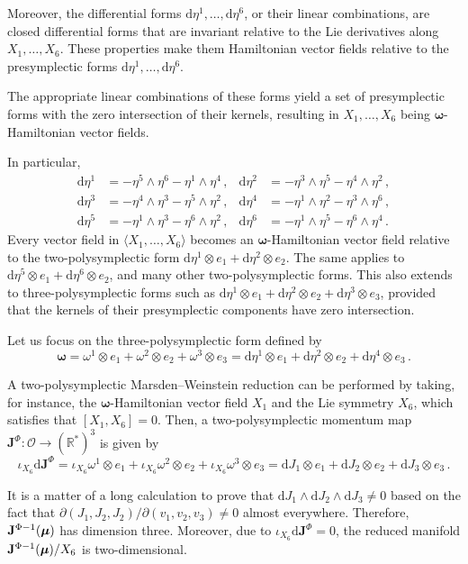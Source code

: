 \documentclass[11pt]{article}
\theoremstyle{plain}
\theoremstyle{definition}
\newcommand{\R}{\mathbb{R}}
\newcommand{\bomega}{{\boldsymbol{\omega}}}
\renewcommand{\d}{\mathrm{d}}
\def\d{\mathrm{d}}
\numberwithin{equation}{section}
\begin{document}
Moreover, the differential forms $\d\eta^1,\ldots, \d\eta^6$, or their linear combinations, are closed differential forms that are invariant relative to the Lie derivatives along $X_1,\ldots, X_6$. These properties make them Hamiltonian vector fields relative to the presymplectic forms $\d\eta^1,\ldots, \d\eta^6$.

The appropriate linear combinations of these forms yield a set of presymplectic forms with the zero intersection of their kernels,  resulting in $X_1,\ldots, X_6$ being $\bomega$-Hamiltonian vector fields.

In particular, 
\begin{align}
    \d\eta^1 &= -\eta^5\wedge\eta^6 - \eta^1\wedge \eta^4\,, & \d\eta^2 &= -\eta^3\wedge \eta^5 - \eta^4\wedge\eta^2\,,\\
    \d\eta^3 &= -\eta^4\wedge\eta^3-\eta^5\wedge\eta^2\,, & \d\eta^4 &= -\eta^1\wedge\eta^2-\eta^3\wedge\eta^6\,,\\
    \d\eta^5 &= -\eta^1\wedge\eta^3-\eta^6\wedge\eta^2\,, & \d\eta^6 &= -\eta^1\wedge\eta^5-\eta^6\wedge\eta^4\,.
\end{align}
Every vector field in $\langle X_1,\ldots,X_6\rangle$ becomes an $\bomega$-Hamiltonian vector field relative to the two-polysymplectic form $\d\eta^1\otimes e_1+\d\eta^2\otimes e_2$. The same applies to $\d\eta^5\otimes e_1+\d\eta^6\otimes e_2$, and many other two-polysymplectic forms. This also extends to three-polysymplectic forms such as $\d \eta^1\otimes e_1+\d \eta^2\otimes e_2+\d \eta^3\otimes e_3$, provided that the kernels of their presymplectic components have zero intersection.

Let us focus on the three-polysymplectic form  defined by
\[
\bomega=\omega^1\otimes e_1+\omega^2\otimes e_2+\omega^3\otimes e_3=\d\eta^1\otimes e_1+\d\eta^2
\otimes e_2+\d\eta^4\otimes e_3\,.
\]

A two-polysymplectic Marsden--Weinstein reduction can be performed by taking, for instance, the $\bomega$-Hamiltonian vector field $X_1$ and the Lie symmetry $X_6$, which satisfies that $[X_1,X_6]=0$. Then, a two-polysymplectic momentum map $\mathbf{J}^\Phi:\mathcal{O}\rightarrow (\R^*)^3$ is given by
\[
\iota_{X_6}\d\mathbf{J}^\Phi = \iota_{X_6}\omega^1\otimes e_1+\iota_{X_6}\omega^2\otimes e_2+\iota_{X_6}\omega^3\otimes e_3=\d J_1\otimes e_1+\d J_2\otimes e_2+\d J_3\otimes e_3\,.
\]



It is a matter of a long calculation to prove that $\d J_1\wedge \d J_2\wedge \d J_3\neq 0$ based on the fact that $\partial (J_1,J_2,J_2)/\partial (v_1,v_2,v_3)\neq 0$ almost everywhere. Therefore, ${
\bf J}^{\Phi-1}(\boldsymbol{\mu})$ has dimension three. Moreover, due to $\iota_{X_6}\d\mathbf{J}^\Phi=0$, the reduced manifold ${
\bf J}^{\Phi-1}(\boldsymbol{\mu})/X_6$ is two-dimensional. 
\end{document}
